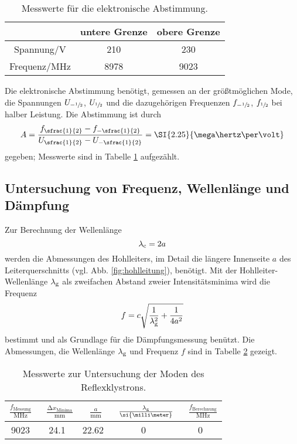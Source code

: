 %
\begin{table}
\centering
\caption{Messwerte für die elektronische Abstimmung.}
\begin{tabular}{c cc}
	\toprule
	&{untere Grenze} &{obere Grenze}\\
	\midrule
		{Spannung/$\si{\volt}$} &210 &230 \\
		{Frequenz/$\si{\mega\hertz}$} &8978 &9023\\
	\bottomrule
\end{tabular}
\label{tab:elktr_abstimmung}
\end{table}
%
Die elektronische Abstimmung benötigt, gemessen an der größtmöglichen Mode, die Spannungen $U_{-\sfrac{1}{2}}$, $U_{\sfrac{1}{2}}$ und die dazugehörigen Frequenzen $f_{-\sfrac{1}{2}}$, $f_{\sfrac{1}{2}}$ bei halber Leistung.
Die Abstimmung ist durch
\begin{equation}
	A=\frac{f_{\sfrac{1}{2}}-f_{-\sfrac{1}{2}}}{U_{\sfrac{1}{2}}-U_{-\sfrac{1}{2}}} = \SI{2.25}{\mega\hertz\per\volt}
\end{equation}
gegeben;
Messwerte sind in Tabelle \ref{tab:elktr_abstimmung} aufgezählt.

\subsection{Untersuchung von Frequenz, Wellenlänge und Dämpfung}
Zur Berechnung der Wellenlänge 
\begin{equation}
	\lambda_\text c = 2a
\end{equation} 
werden die Abmessungen des Hohlleiters, im Detail die längere Innenseite $a$ des Leiterquerschnitts (vgl. Abb. \ref{fig:hohlleitung}), benötigt. 
Mit der Hohlleiter-Wellenlänge $\lambda_\text g$ als zweifachen Abstand zweier Intensitätsminima wird die Frequenz 
\begin{equation}
	f=c\sqrt{\frac{1}{\lambda^2_\text g}+\frac{1}{4a^2}}
\end{equation}
bestimmt und als Grundlage für die Dämpfungsmessung benützt.
Die Abmessungen, die Wellenlänge $\lambda_\text g$ und Frequenz $f$ sind in Tabelle \ref{tab:flambdagamma}
gezeigt. 
\begin{table}
\centering
\caption{Messwerte zur Untersuchung der Moden des Reflexklystrons.}
\begin{tabular}{ccccc}
	\toprule
	$\frac{f_\text{Messung}}{\si{\mega\hertz}}$& \
	$\frac{\mathup{\Delta}x_\text{Minima}}{\si{\milli\meter}}$& \
	$\frac{a}{\si{\milli\meter}}$& \
	$\frac{\lambda_\text g}{\si{\milli\meter}}$& \
	$\frac{f_\text{Berechnung}}{\si{\mega\hertz}}$\\
	\midrule
		9023&	24.1&	22.62&	0&	0\\
	\bottomrule
\end{tabular}
\label{tab:flambdagamma}
\end{table}